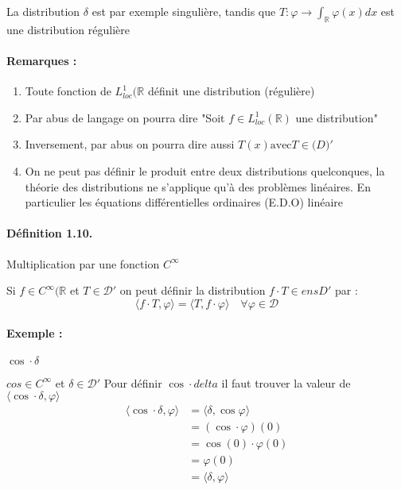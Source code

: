 \documentclass[12pt,a4paper]{report}
\newcommand{\Ens}[1]{\ensuremath{\mathbb{#1}}}
\newcommand{\ens}[1]{\ensuremath{\mathbb{#1}}}
\newcommand{\D}{\ensuremath{\mathcal{D}}}
\begin{document}
La distribution \(\delta\) est par exemple singulière, tandis que \(T : \varphi \rightarrow \int_{\Ens{R}} \varphi(x) dx\) est une distribution régulière

\paragraph{Remarques :}
\begin{enumerate}
	\item Toute fonction de \(L^1_{loc}(\ens{R}\) définit une distribution (régulière)
	\item Par abus de langage on pourra dire "Soit \(f \in L^1_{loc} (\ens{R})\) une distribution"
	\item Inversement, par abus on pourra dire aussi \(T(x) \text{avec} T \in \ens(D)'\)
	\item On ne peut pas définir le produit entre deux distributions quelconques, la théorie des distributions ne s'applique qu'à des problèmes linéaires. En particulier les équations différentielles ordinaires (E.D.O) linéaire
\end{enumerate}

\paragraph{Définition 1.10.} Multiplication par une fonction \(C^{\infty}\)

Si \(f \in C^{\infty}(\ens{R} \) et \(T\in \D'\) on peut définir la distribution \(f\cdot T \in ens{D}'\) par :
\[
	\langle f\cdot T, \varphi \rangle = \langle T, f\cdot \varphi \rangle \quad \forall \varphi \in \D
\]

\paragraph{Exemple :} \(\cos \cdot \delta\)

\(cos \in C^{\infty}\) et \(\delta \in \D'\)
Pour définir \(\cos \cdot delta\) il faut trouver la valeur de \(\langle \cos \cdot \delta, \varphi \rangle\)
\begin{align*}
	\langle \cos \cdot \delta, \varphi \rangle &= \langle \delta, \cos \varphi \rangle\\
	&= (\cos \cdot \varphi)(0)\\
	&= \cos(0) \cdot \varphi(0)\\
	&= \varphi (0)\\
	&= \langle \delta, \varphi \rangle
\end{align*}
\end{document}
